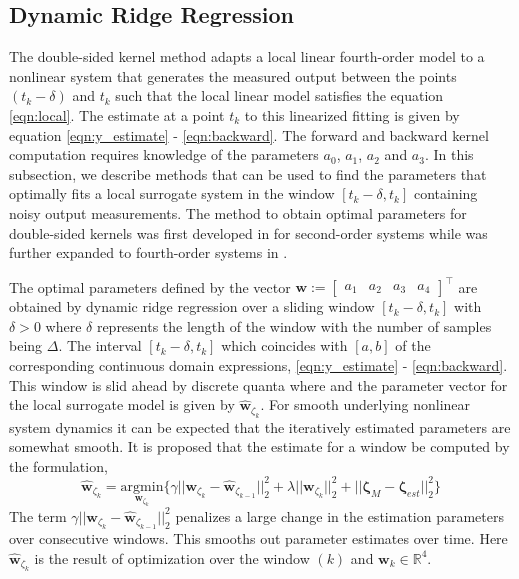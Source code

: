 \documentclass[letterpaper%
, twoside%
, 12pt%
,memoire%
, english%
,creativecommons,hyperref%
]{thETS}
\theoremstyle{newThmStyle}
\begin{document}
\subsection{Dynamic Ridge Regression} \label{Sec:ridge}
The double-sided kernel method adapts a local linear fourth-order model to a nonlinear system that generates the measured output between the points $(t_k-\delta)$ and $t_k$ such that the local linear model satisfies the equation \eqref{eqn:local}. The estimate at a point $t_k$ to this linearized fitting is given by equation \eqref{eqn:y_estimate} - \eqref{eqn:backward}. The forward and backward kernel computation requires knowledge of the parameters $a_0$, $a_1$, $a_2$ and $a_3$. In this subsection, we describe methods that can be used to find the parameters that optimally fits a local surrogate system in the window $[t_k-\delta,t_k]$ containing noisy output measurements. The method to obtain optimal parameters for double-sided kernels was first developed in \citep{RN118} for second-order systems while was further expanded to fourth-order systems in \citep{RN83}.

The optimal parameters defined by the vector $\mathbf{w}:=\begin{bmatrix}a_1& a_2& a_3&a_4\end{bmatrix}^{\intercal}$ are obtained by dynamic ridge regression over a sliding window $[t_k-\delta,t_k]$ with $\delta>0$ where $\delta$ represents the length of the window with the number of samples being $\Delta$. The interval $[t_k-\delta,t_k]$ which coincides with $[a,b]$ of the corresponding continuous domain expressions, \eqref{eqn:y_estimate} - \eqref{eqn:backward}. This window is slid ahead by discrete quanta where and the parameter vector for the local surrogate model is given by $\hat{\mathbf{w}}_{\zeta_k}$. For smooth underlying nonlinear system dynamics it can be expected that the iteratively estimated parameters are somewhat smooth. It is proposed that the estimate for a window be computed by the formulation, 
\begin{equation}\label{eqn:paramdynamic}
\hat{\mathbf{w}}_{\zeta_k}=\underset{\mathbf{w}_{\zeta_k}}{\text{argmin}} 	\big\{\gamma||\mathbf{w}_{\zeta_k}-\mathbf{\hat{w}}_{\zeta_{k-1}}||^{2}_{2} + \lambda||\mathbf{w}_{\zeta_k}||^{2}_{2} + ||\mathbf{\zeta}_M-\mathbf{\zeta}_{est}||^{2}_{2}\big\}
\end{equation}
The term $\gamma||\mathbf{w}_{\zeta_k}-\mathbf{\hat{w}}_{\zeta_{k-1}}||^{2}_{2}$ penalizes a large change in the estimation parameters over consecutive windows. This smooths out parameter estimates over time. Here $\mathbf{\hat{w}}_{\zeta_k}$ is the result of optimization over the window $(k)$ and $\mathbf{w}_k\in \mathbb{R}^{4}$. 
\end{document}
